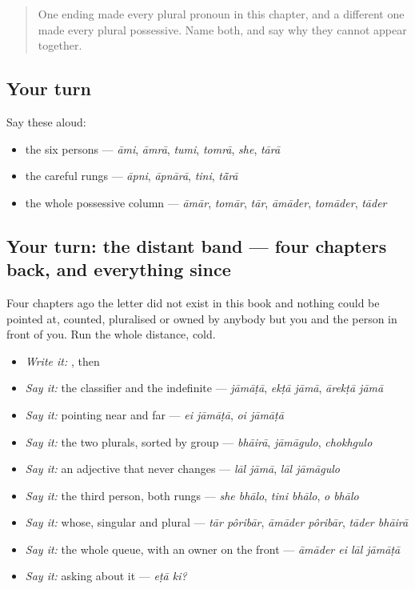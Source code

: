\label{lesson:BN-R24-all-of-us}



\begin{quote}
One ending made every plural pronoun in this chapter, and a different one made every plural possessive. Name both, and say why they cannot appear together.
\end{quote}

\subsection*{Your turn}
Say these aloud:

\begin{itemize}
\raggedright
  \item the six persons — \emph{āmi}, \emph{āmrā}, \emph{tumi}, \emph{tomrā}, \emph{she}, \emph{tārā}
  \item the careful rungs — \emph{āpni}, \emph{āpnārā}, \emph{tini}, \emph{tā̃rā}
  \item the whole possessive column — \emph{āmār}, \emph{tomār}, \emph{tār}, \emph{āmāder}, \emph{tomāder}, \emph{tāder}
\end{itemize}

\subsection*{Your turn: the distant band — four chapters back, and everything since}
Four chapters ago the letter \textbf{} did not exist in this book and nothing could be pointed at, counted, pluralised or owned by anybody but you and the person in front of you. Run the whole distance, cold.

\begin{itemize}
\raggedright
  \item \emph{Write it:} , then 
  \item \emph{Say it:} the classifier and the indefinite — \emph{jāmāṭā}, \emph{ekṭā jāmā}, \emph{ārekṭā jāmā}
  \item \emph{Say it:} pointing near and far — \emph{ei jāmāṭā}, \emph{oi jāmāṭā}
  \item \emph{Say it:} the two plurals, sorted by group — \emph{bhāirā}, \emph{jāmāgulo}, \emph{chokhgulo}
  \item \emph{Say it:} an adjective that never changes — \emph{lāl jāmā}, \emph{lāl jāmāgulo}
  \item \emph{Say it:} the third person, both rungs — \emph{she bhālo}, \emph{tini bhālo}, \emph{o bhālo}
  \item \emph{Say it:} whose, singular and plural — \emph{tār pôribār}, \emph{āmāder pôribār}, \emph{tāder bhāirā}
  \item \emph{Say it:} the whole queue, with an owner on the front — \emph{āmāder ei lāl jāmāṭā}
  \item \emph{Say it:} asking about it — \emph{eṭā ki?}
\end{itemize}

